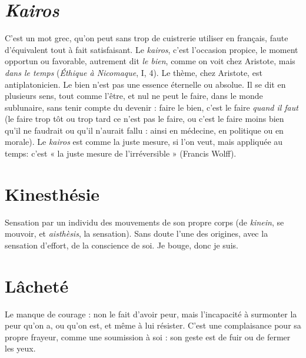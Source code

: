 {\section{{\it Kairos}}
C'est un mot grec, qu’on peut sans trop de cuistrerie utiliser en
français, faute d’équivalent tout à fait satisfaisant. Le {\it kairos}, c’est
l’occasion propice, le moment opportun ou favorable, autrement dit {\it le bien},
comme on voit chez Aristote, mais {\it dans le temps} ({\it Éthique à Nicomaque}, I, 4).
Le thème, chez Aristote, est antiplatonicien. Le bien n’est pas une essence éternelle
ou absolue. Il se dit en plusieurs sens, tout comme l’être, et nul ne peut le
faire, dans le monde sublunaire, sans tenir compte du devenir : faire le bien,
c’est le faire {\it quand il faut} (le faire trop tôt ou trop tard ce n’est pas le faire, ou
c’est le faire moins bien qu’il ne faudrait ou qu’il n’aurait fallu : ainsi en médecine,
en politique ou en morale). Le {\it kairos} est comme la juste mesure, si l’on
veut, mais appliquée au temps: c’est « la juste mesure de l’irréversible »
(Francis Wolff).

\section{Kinesthésie}
Sensation par un individu des mouvements de son propre
corps (de {\it kinein}, se mouvoir, et {\it aisthèsis}, la sensation). Sans
doute l’une des origines, avec la sensation d’effort, de la conscience de soi. Je
bouge, donc je suis.

\section{Lâcheté}
Le manque de courage : non le fait d’avoir peur, mais l’incapacité
à surmonter la peur qu’on a, ou qu’on est, et même à lui
résister. C’est une complaisance pour sa propre frayeur, comme une soumission
à soi : son geste est de fuir ou de fermer les yeux.

}
